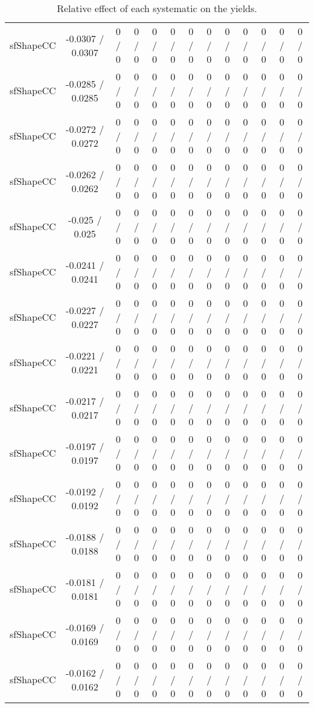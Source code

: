 \documentclass[10pt]{article}
\begin{document}
\begin{table}[htbp]
\begin{center}
\begin{tabular}{|c|c|c|c|c|c|c|c|c|c|c|c|c|}
  sfShapeCC & -0.0307 / 0.0307 & 0 / 0 & 0 / 0 & 0 / 0 & 0 / 0 & 0 / 0 & 0 / 0 & 0 / 0 & 0 / 0 & 0 / 0 & 0 / 0 & 0 / 0 \\ 
  sfShapeCC & -0.0285 / 0.0285 & 0 / 0 & 0 / 0 & 0 / 0 & 0 / 0 & 0 / 0 & 0 / 0 & 0 / 0 & 0 / 0 & 0 / 0 & 0 / 0 & 0 / 0 \\ 
  sfShapeCC & -0.0272 / 0.0272 & 0 / 0 & 0 / 0 & 0 / 0 & 0 / 0 & 0 / 0 & 0 / 0 & 0 / 0 & 0 / 0 & 0 / 0 & 0 / 0 & 0 / 0 \\ 
  sfShapeCC & -0.0262 / 0.0262 & 0 / 0 & 0 / 0 & 0 / 0 & 0 / 0 & 0 / 0 & 0 / 0 & 0 / 0 & 0 / 0 & 0 / 0 & 0 / 0 & 0 / 0 \\ 
  sfShapeCC & -0.025 / 0.025 & 0 / 0 & 0 / 0 & 0 / 0 & 0 / 0 & 0 / 0 & 0 / 0 & 0 / 0 & 0 / 0 & 0 / 0 & 0 / 0 & 0 / 0 \\ 
  sfShapeCC & -0.0241 / 0.0241 & 0 / 0 & 0 / 0 & 0 / 0 & 0 / 0 & 0 / 0 & 0 / 0 & 0 / 0 & 0 / 0 & 0 / 0 & 0 / 0 & 0 / 0 \\ 
  sfShapeCC & -0.0227 / 0.0227 & 0 / 0 & 0 / 0 & 0 / 0 & 0 / 0 & 0 / 0 & 0 / 0 & 0 / 0 & 0 / 0 & 0 / 0 & 0 / 0 & 0 / 0 \\ 
  sfShapeCC & -0.0221 / 0.0221 & 0 / 0 & 0 / 0 & 0 / 0 & 0 / 0 & 0 / 0 & 0 / 0 & 0 / 0 & 0 / 0 & 0 / 0 & 0 / 0 & 0 / 0 \\ 
  sfShapeCC & -0.0217 / 0.0217 & 0 / 0 & 0 / 0 & 0 / 0 & 0 / 0 & 0 / 0 & 0 / 0 & 0 / 0 & 0 / 0 & 0 / 0 & 0 / 0 & 0 / 0 \\ 
  sfShapeCC & -0.0197 / 0.0197 & 0 / 0 & 0 / 0 & 0 / 0 & 0 / 0 & 0 / 0 & 0 / 0 & 0 / 0 & 0 / 0 & 0 / 0 & 0 / 0 & 0 / 0 \\ 
  sfShapeCC & -0.0192 / 0.0192 & 0 / 0 & 0 / 0 & 0 / 0 & 0 / 0 & 0 / 0 & 0 / 0 & 0 / 0 & 0 / 0 & 0 / 0 & 0 / 0 & 0 / 0 \\ 
  sfShapeCC & -0.0188 / 0.0188 & 0 / 0 & 0 / 0 & 0 / 0 & 0 / 0 & 0 / 0 & 0 / 0 & 0 / 0 & 0 / 0 & 0 / 0 & 0 / 0 & 0 / 0 \\ 
  sfShapeCC & -0.0181 / 0.0181 & 0 / 0 & 0 / 0 & 0 / 0 & 0 / 0 & 0 / 0 & 0 / 0 & 0 / 0 & 0 / 0 & 0 / 0 & 0 / 0 & 0 / 0 \\ 
  sfShapeCC & -0.0169 / 0.0169 & 0 / 0 & 0 / 0 & 0 / 0 & 0 / 0 & 0 / 0 & 0 / 0 & 0 / 0 & 0 / 0 & 0 / 0 & 0 / 0 & 0 / 0 \\ 
  sfShapeCC & -0.0162 / 0.0162 & 0 / 0 & 0 / 0 & 0 / 0 & 0 / 0 & 0 / 0 & 0 / 0 & 0 / 0 & 0 / 0 & 0 / 0 & 0 / 0 & 0 / 0 \\ 
\hline 
\end{tabular} 
\caption{Relative effect of each systematic on the yields.} 
\end{center} 
\end{table} 
\end{document}
